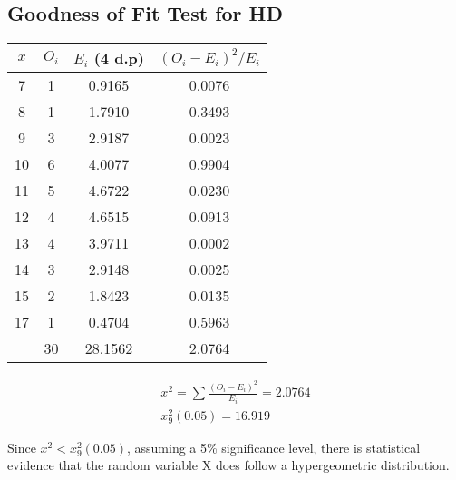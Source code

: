 \documentclass{article}
\begin{document}
\subsection{Goodness of Fit Test for HD}
\begin{center}
  \begin{tabular}{|c|c|c|c|}
  \hline
    $ x $ & $ O_i $ & $ E_i $ (4 d.p) & $(O_i - E_i)^2 / E_i$ \\
    \hline
    \hline
    7  & 1 & 0.9165 & 0.0076 \\
    8  & 1 & 1.7910 & 0.3493 \\
    9  & 3 & 2.9187 & 0.0023 \\
    10 & 6 & 4.0077 & 0.9904 \\
    11 & 5 & 4.6722 & 0.0230 \\
    12 & 4 & 4.6515 & 0.0913 \\
    13 & 4 & 3.9711 & 0.0002 \\
    14 & 3 & 2.9148 & 0.0025 \\
    15 & 2 & 1.8423 & 0.0135 \\
    17 & 1 & 0.4704 & 0.5963 \\
    \hline
    \hline
       & 30& 28.1562& 2.0764 \\
    \hline
  \end{tabular}
\end{center}

\begin{gather*}
  x^2 = \sum \frac{(O_i - E_i)^2}{E_i} = 2.0764 \\[5pt]
  x^2_9(0.05) = 16.919
\end{gather*}

Since $ x^2 < x^2_9(0.05) $,
assuming a 5\% significance level,
there is statistical evidence that
the random variable X does 
follow a hypergeometric distribution.
\end{document}
